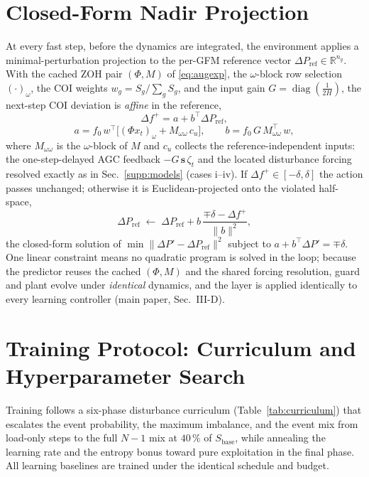 \documentclass[lettersize,journal]{IEEEtran}
\begin{document}
\section{Closed-Form Nadir Projection}
\label{supp:projection}
At every fast step, before the dynamics are integrated, the environment applies a minimal-perturbation projection to the per-GFM reference vector $\Delta P_{\mathrm{ref}}\in\mathbb{R}^{n_g}$. With the cached ZOH pair $(\Phi,M)$ of \eqref{eq:augexp}, the $\omega$-block row selection $(\cdot)_\omega$, the COI weights $w_g=S_g/\sum_g S_g$, and the input gain $G=\operatorname{diag}(\tfrac{1}{2H})$, the next-step COI deviation is \emph{affine} in the reference,
\begin{equation}
  \Delta f^{+}=a+b^{\!\top}\Delta P_{\mathrm{ref}},
  \label{eq:affine_pred}
\end{equation}
\begin{equation}
  a=f_0\,w^{\!\top}\!\big[(\Phi x_t)_\omega+M_{\omega\omega}\,c_u\big],
  \qquad
  b=f_0\,G\,M_{\omega\omega}^{\!\top}\,w,
  \label{eq:affine_coeffs}
\end{equation}
where $M_{\omega\omega}$ is the $\omega$-block of $M$ and $c_u$ collects the reference-independent inputs: the one-step-delayed AGC feedback $-G\,\mathbf s\,\zeta_t$ and the located disturbance forcing resolved exactly as in Sec.~\ref{supp:models} (cases i--iv). If $\Delta f^{+}\in[-\delta,\delta]$ the action passes unchanged; otherwise it is Euclidean-projected onto the violated half-space,
\begin{equation}
  \Delta P_{\mathrm{ref}}\;\leftarrow\;
  \Delta P_{\mathrm{ref}}
  + b\,\frac{\mp\delta-\Delta f^{+}}{\lVert b\rVert^{2}},
  \label{eq:projection}
\end{equation}
the closed-form solution of $\min\lVert\Delta P'-\Delta P_{\mathrm{ref}}\rVert^2$ subject to $a+b^{\!\top}\Delta P'=\mp\delta$. One linear constraint means no quadratic program is solved in the loop; because the predictor reuses the cached $(\Phi,M)$ and the shared forcing resolution, guard and plant evolve under \emph{identical} dynamics, and the layer is applied identically to every learning controller (main paper, Sec.~III-D).


\section{Training Protocol: Curriculum and Hyperparameter Search}
\label{supp:training}
Training follows a six-phase disturbance curriculum (Table~\ref{tab:curriculum}) that escalates the event probability, the maximum imbalance, and the event mix from load-only steps to the full $N{-}1$ mix at $40\,\%$ of $S_{\mathrm{base}}$, while annealing the learning rate and the entropy bonus toward pure exploitation in the final phase. All learning baselines are trained under the identical schedule and budget.
\end{document}
